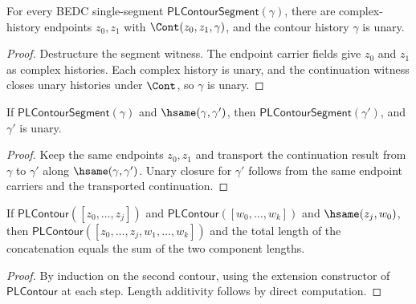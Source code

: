 \begin{lemma}
\label{lem:pl-contour-well-formed}
For every BEDC single-segment \(\mathsf{PLContourSegment}(\gamma)\), there are complex-history endpoints \(z_0,z_1\) with \(\Cont(z_0,z_1,\gamma)\), and the contour history \(\gamma\) is unary.
\end{lemma}
\begin{proof}
Destructure the segment witness. The endpoint carrier fields give \(z_0\) and \(z_1\) as complex histories. Each complex history is unary, and the continuation witness closes unary histories under \(\Cont\), so \(\gamma\) is unary.
\end{proof}


\begin{lemma}
\label{lem:pl-contour-segment-hsame-transport}
If \(\mathsf{PLContourSegment}(\gamma)\) and \(\hsame(\gamma,\gamma')\), then \(\mathsf{PLContourSegment}(\gamma')\), and \(\gamma'\) is unary.
\end{lemma}
\begin{proof}
Keep the same endpoints \(z_0,z_1\) and transport the continuation result from \(\gamma\) to \(\gamma'\) along \(\hsame(\gamma,\gamma')\). Unary closure for \(\gamma'\) follows from the same endpoint carriers and the transported continuation.
\end{proof}


\begin{lemma}
\label{lem:pl-contour-concat}
If \(\mathsf{PLContour}([z_0, \ldots, z_j])\) and \(\mathsf{PLContour}([w_0, \ldots, w_k])\) and \(\hsame(z_j, w_0)\), then \(\mathsf{PLContour}([z_0, \ldots, z_j, w_1, \ldots, w_k])\) and the total length of the concatenation equals the sum of the two component lengths.
\end{lemma}
\begin{proof}
By induction on the second contour, using the extension constructor of \(\mathsf{PLContour}\) at each step. Length additivity follows by direct computation.
\end{proof}

